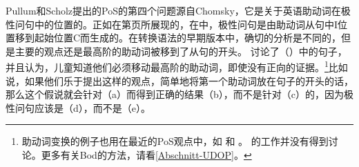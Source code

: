 Pullum和Scholz提出的PoS的第四个问题源自Chomsky，它是关于英语助动词在极性问句中的位置的。正如在第\pageref{Seite-GB-Entscheidungsfragen-Englisch}页所展现的，在\gbtc 中，极性问句是由助动词从句中I位置移到起始位置C而生成的。在转换语法的早期版本中，确切的分析是不同的，但是主要的观点还是最高阶的助动词被移到了从句的开头。
  \citet[--33]{Chomsky71a-u}讨论了（）中的句子，并且认为，儿童知道他们必须移动最高阶的助动词，即使没有正向的证据。\footnote{%
 助动词变换的例子也用在最近的PoS观点中，如 和 。 \citet{Bod2009a}的工作并没有得到讨论。更多有关Bod的方法，请看\ref{Abschnitt-UDOP}。
 }比如说，如果他们乐于提出这样的观点，简单地将第一个助动词放在句子的开头的话，那么这个假说就会针对（a）而得到正确的结果（b），而不是针对（c）的，因为极性问句应该是（d），而不是（e）。
\eal
{}

